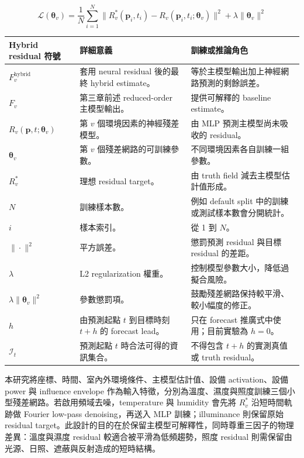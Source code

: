 \documentclass[12pt,a4paper]{article}
\begin{document}
\[
\mathcal{L}(\boldsymbol{\theta}_v) = \frac{1}{N}\sum_{i=1}^{N}\bigl\|R_v^*(\mathbf{p}_i,t_i) - R_v(\mathbf{p}_i,t_i;\boldsymbol{\theta}_v)\bigr\|^2 + \lambda\|\boldsymbol{\theta}_v\|^2
\]

\begin{table}[htbp]
\centering
\footnotesize
\renewcommand{\arraystretch}{1.25}
\begin{tabular}{|>{\raggedright\arraybackslash}p{}|>{\raggedright\arraybackslash}p{}|>{\raggedright\arraybackslash}p{}|}
\hline
\textbf{Hybrid residual 符號} & \textbf{詳細意義} & \textbf{訓練或推論角色} \\
\hline
$F_v^{\text{hybrid}}$ & 套用 neural residual 後的最終 hybrid estimate。 & 等於主模型輸出加上神經網路預測的剩餘誤差。 \\
\hline
$F_v$ & 第三章前述 reduced-order 主模型輸出。 & 提供可解釋的 baseline estimate。 \\
\hline
$R_v(\mathbf{p},t;\boldsymbol{\theta}_v)$ & 第 $v$ 個環境因素的神經殘差模型。 & 由 MLP 預測主模型尚未吸收的 residual。 \\
\hline
$\boldsymbol{\theta}_v$ & 第 $v$ 個殘差網路的可訓練參數。 & 不同環境因素各自訓練一組參數。 \\
\hline
$R_v^*$ & 理想 residual target。 & 由 truth field 減去主模型估計值形成。 \\
\hline
$N$ & 訓練樣本數。 & 例如 default split 中的訓練或測試樣本數會分開統計。 \\
\hline
$i$ & 樣本索引。 & 從 1 到 $N$。 \\
\hline
$\|\cdot\|^2$ & 平方誤差。 & 懲罰預測 residual 與目標 residual 的差距。 \\
\hline
$\lambda$ & L2 regularization 權重。 & 控制模型參數大小，降低過擬合風險。 \\
\hline
$\lambda\|\boldsymbol{\theta}_v\|^2$ & 參數懲罰項。 & 鼓勵殘差網路保持較平滑、較小幅度的修正。 \\
\hline
$h$ & 由預測起點 $t$ 到目標時刻 $t+h$ 的 forecast lead。 & 只在 forecast 推廣式中使用；目前實驗為 $h=0$。 \\
\hline
$\mathcal{I}_t$ & 預測起點 $t$ 時合法可得的資訊集合。 & 不得包含 $t+h$ 的實測真值或 truth residual。 \\
\hline
\end{tabular}
\end{table}

本研究將座標、時間、室內外環境條件、主模型估計值、設備 activation、設備 power 與 influence envelope 作為輸入特徵，分別為溫度、濕度與照度訓練三個小型殘差網路。若啟用頻域去噪，temperature 與 humidity 會先將 $R_v^*$ 沿短時間軌跡做 Fourier low-pass denoising，再送入 MLP 訓練；illuminance 則保留原始 residual target。此設計的目的在於保留主模型可解釋性，同時尊重三因子的物理差異：溫度與濕度 residual 較適合被平滑為低頻趨勢，照度 residual 則需保留由光源、日照、遮蔽與反射造成的短時結構。
\end{document}

